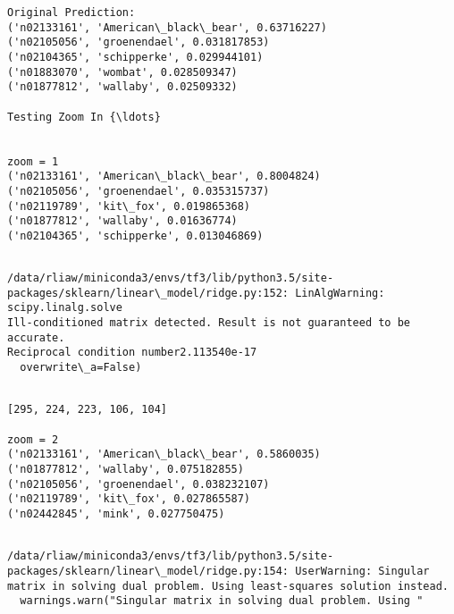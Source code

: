 \documentclass[11pt]{article}
\begin{document}
    \begin{Verbatim}[commandchars=\\\{\}]
Original Prediction:
('n02133161', 'American\_black\_bear', 0.63716227)
('n02105056', 'groenendael', 0.031817853)
('n02104365', 'schipperke', 0.029944101)
('n01883070', 'wombat', 0.028509347)
('n01877812', 'wallaby', 0.02509332)

Testing Zoom In {\ldots}


zoom = 1
('n02133161', 'American\_black\_bear', 0.8004824)
('n02105056', 'groenendael', 0.035315737)
('n02119789', 'kit\_fox', 0.019865368)
('n01877812', 'wallaby', 0.01636774)
('n02104365', 'schipperke', 0.013046869)


    \end{Verbatim}

    \begin{Verbatim}[commandchars=\\\{\}]
/data/rliaw/miniconda3/envs/tf3/lib/python3.5/site-packages/sklearn/linear\_model/ridge.py:152: LinAlgWarning: scipy.linalg.solve
Ill-conditioned matrix detected. Result is not guaranteed to be accurate.
Reciprocal condition number2.113540e-17
  overwrite\_a=False)

    \end{Verbatim}

    \begin{Verbatim}[commandchars=\\\{\}]

[295, 224, 223, 106, 104]

zoom = 2
('n02133161', 'American\_black\_bear', 0.5860035)
('n01877812', 'wallaby', 0.075182855)
('n02105056', 'groenendael', 0.038232107)
('n02119789', 'kit\_fox', 0.027865587)
('n02442845', 'mink', 0.027750475)


    \end{Verbatim}

    \begin{Verbatim}[commandchars=\\\{\}]
/data/rliaw/miniconda3/envs/tf3/lib/python3.5/site-packages/sklearn/linear\_model/ridge.py:154: UserWarning: Singular matrix in solving dual problem. Using least-squares solution instead.
  warnings.warn("Singular matrix in solving dual problem. Using "

    \end{Verbatim}
\end{document}
